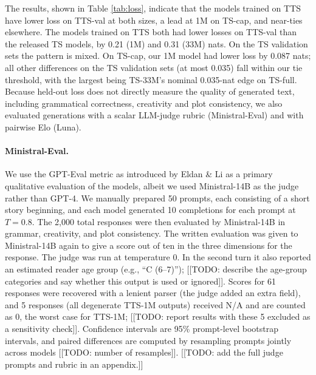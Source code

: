 \documentclass{article}
\newif\ifmarkup
\DeclareRobustCommand{\ins}[1]{\ifmarkup\textbf{#1}\else#1\fi}
\begin{document}
The results, shown in Table \ref{tab:loss}, indicate that the models trained on TTS have lower loss on TTS-val at both sizes, a lead at 1M on TS-cap, and near-ties elsewhere. The models trained on TTS both had lower losses on TTS-val than the released TS models, by 0.21 (1M) and 0.31 (33M) nats. On the TS validation sets the pattern is mixed. On TS-cap, our 1M model had lower loss by 0.087 nats; all other differences on the TS validation sets (at most 0.035) fall within our tie threshold, with the largest being TS-33M's nominal 0.035-nat edge on TS-full. Because held-out loss does not directly measure the quality of generated text, including grammatical correctness, creativity and plot consistency, we also evaluated generations with a scalar LLM-judge rubric (Ministral-Eval) and with pairwise Elo (Luna).

\paragraph{Ministral-Eval.}

We use the GPT-Eval metric as introduced by Eldan \& Li as a primary qualitative evaluation of the models, albeit we used Ministral-14B as the judge rather than GPT-4. We manually prepared 50 prompts, each consisting of a short story beginning, and each model generated 10 completions for each prompt at $T=0.8$. The 2,000 total responses were then evaluated by Ministral-14B in grammar, creativity, and plot consistency. The written evaluation was given to Ministral-14B again to give a score out of ten in the three dimensions for the response. \ins{The judge was run at temperature 0. In the second turn it also reported an estimated reader age group (e.g., ``C (6--7)''); [[TODO: describe the age-group categories and say whether this output is used or ignored]]. Scores for 61 responses were recovered with a lenient parser (the judge added an extra field), and 5 responses (all degenerate TTS-1M outputs) received N/A and are counted as 0, the worst case for TTS-1M; [[TODO: report results with these 5 excluded as a sensitivity check]]. Confidence intervals are 95\% prompt-level bootstrap intervals, and paired differences are computed by resampling prompts jointly across models [[TODO: number of resamples]]. [[TODO: add the full judge prompts and rubric in an appendix.]]}
\end{document}
